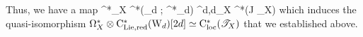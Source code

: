 Thus, we have a map
\ben
\Omega^*_X \tensor \cred^*(\W_d ; \hOmega^*_d) \to \Omega^{d,d}_X \tensor \cred^*(J \sT_X)
\een
which induces the quasi-isomorphism $\Omega^*_X \otimes {\rm C}_{\rm Lie, red}^*({\rm W}_d) [2d] \simeq {\rm C}_{\rm loc}^*(\mathscr T_X)$ that we established above.

%
%


%

